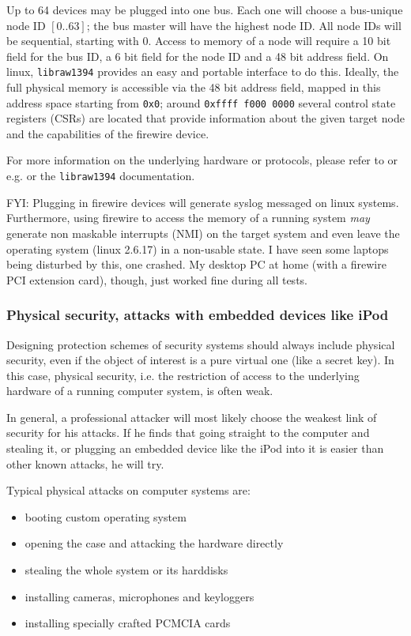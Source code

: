 Up to 64 devices may be plugged into one bus. Each one will choose a bus-unique
node ID $[0..63]$; the bus master will have the highest node ID. All node IDs
will be sequential, starting with 0. Access to memory of a node will require a
10 bit field for the bus ID, a 6 bit field for the node ID and a 48 bit address
field.  On linux, \texttt{libraw1394} provides an easy and portable interface to
do this. Ideally, the full physical memory is accessible via the 48 bit address
field, mapped in this address space starting from \texttt{0x0}; around
\texttt{0xffff~f000~0000} several control state registers (CSRs) are located
that provide information about the given target node and the capabilities of the
firewire device.

For more information on the underlying hardware or protocols, please refer to
\cite{OHCIspecs:2000} or e.g. \cite{fwire_sys_arch:2222} or the
\texttt{libraw1394} documentation.

FYI: Plugging in firewire devices will generate syslog messaged on linux
systems. Furthermore, using firewire to access the memory of a running system
\emph{may} generate non maskable interrupts (NMI) on the target system and even
leave the operating system (linux 2.6.17) in a non-usable state. I have seen
some laptops being disturbed by this, one crashed. My desktop PC at home (with a
firewire PCI extension card), though, just worked fine during all tests.



\subsubsection{Physical security, attacks with embedded devices like iPod}

Designing protection schemes of security systems should always include physical
security, even if the object of interest is a pure virtual one (like a secret
key). In this case, physical security, i.e. the restriction of access to the
underlying hardware of a running computer system, is often weak.

In general, a professional attacker will most likely choose the weakest link of
security for his attacks. If he finds that going straight to the computer and
stealing it, or plugging an embedded device like the iPod into it is easier than
other known attacks, he will try.

Typical physical attacks on computer systems are:

\begin{itemize}

	\item booting custom operating system

	\item opening the case and attacking the hardware directly

	\item stealing the whole system or its harddisks

	\item installing cameras, microphones and keyloggers

	\item installing specially crafted PCMCIA cards

\end{itemize}

